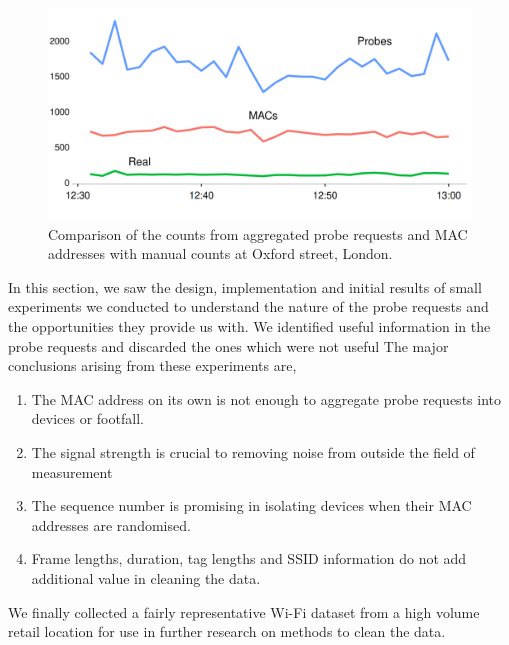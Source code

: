 \begin{figure}
  \includegraphics[trim={0 0 0 0},clip]{images/oxst-counts.png}
  \caption{Comparison of the counts from aggregated probe requests and MAC addresses with manual counts at Oxford street, London.}
  \label{figure:collection:oxst:initial}
\end{figure}

In this section, we saw the design, implementation and initial results of small experiments we conducted to understand the nature of the probe requests and the opportunities they provide us with.
We identified useful information in the probe requests and discarded the ones which were not useful
The major conclusions arising from these experiments are,

\begin{enumerate}[rightmargin = 2em, leftmargin = 2em]
  \itemsep-0.25em
  \item The MAC address on its own is not enough to aggregate probe requests into devices or footfall.
  \item The signal strength is crucial to removing noise from outside the field of measurement
  \item The sequence number is promising in isolating devices when their MAC addresses are randomised.
  \item Frame lengths, duration, tag lengths and SSID information do not add additional value in cleaning the data.
\end{enumerate}

We finally collected a fairly representative Wi-Fi dataset from a high volume retail location for use in further research on methods to clean the data.

